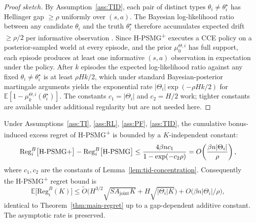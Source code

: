 \begin{proof}[Proof sketch]
By Assumption~\ref{ass:TID}, each pair of distinct types $\theta_i \neq \theta_i^\star$ has Hellinger gap $\geq \rho$ uniformly over $(s, a)$. The Bayesian log-likelihood ratio between any candidate $\theta_i$ and the truth $\theta_i^\star$ therefore accumulates expected drift $\geq \rho/2$ per informative observation \citep[Lemma 5.3]{ghosal2007convergence}. Since H-PSMG\textsuperscript{+} executes a CCE policy on a posterior-sampled world at every episode, and the prior $\mu_0^{\Theta, i}$ has full support, each episode produces at least one informative $(s, a)$ observation in expectation under the policy. After $k$ episodes the expected log-likelihood ratio against any fixed $\theta_i \neq \theta_i^\star$ is at least $\rho H k / 2$, which under standard Bayesian-posterior martingale arguments yields the exponential rate $|\Theta_i| \exp(-\rho H k / 2)$ for $\mathbb{E}[1 - \mu_k^{\Theta, i}(\theta_i^\star)]$. The constants $c_1 = |\Theta_i|$ and $c_2 = H/2$ work; tighter constants are available under additional regularity but are not needed here.
\end{proof}

\begin{proposition}
\label{prop:hpsmg-plus-asymptotic}
Under Assumptions~\ref{ass:TI}, \ref{ass:RL}, \ref{ass:PF}, \ref{ass:TID}, the cumulative bonus-induced excess regret of H-PSMG\textsuperscript{+} is bounded by a $K$-independent constant:
\begin{equation}
\mathrm{Reg}_i^B\big[\textnormal{H-PSMG\textsuperscript{+}}\big] - \mathrm{Reg}_i^B\big[\textnormal{H-PSMG}\big] \leq \frac{4 \beta n c_1}{1 - \exp(-c_2 \rho)} = O\!\left(\frac{\beta n |\Theta_i|}{\rho}\right),
\end{equation}
where $c_1, c_2$ are the constants of Lemma~\ref{lem:tid-concentration}. Consequently the H-PSMG\textsuperscript{+} regret bound is
\begin{equation}
\mathbb{E}\big[\mathrm{Reg}_i^B(K)\big] \leq \tilde O\big(H^{3/2}\sqrt{SA_{\mathrm{joint}}K} + H\sqrt{|\Theta_i| K}\big) + O\big(\beta n |\Theta_i| / \rho\big),
\end{equation}
identical to Theorem~\ref{thm:main-regret} up to a gap-dependent additive constant. The asymptotic rate is preserved.
\end{proposition}

